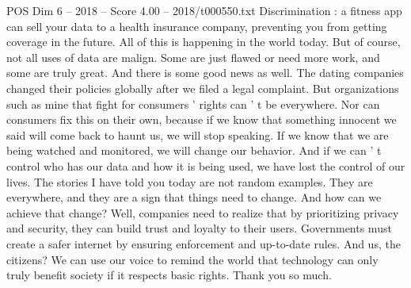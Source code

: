 \begin{textsample}{POS Dim 6 – 2018 – Score 4.00 – 2018/t000550.txt}
Discrimination : a fitness app can sell your data to a health insurance company, preventing you from getting coverage in the future.
All of this is happening in the world today.
But of course, not all uses of data are malign.
Some are just flawed or need more work, and some are truly great.
And there is some good news as well.
The dating companies changed their policies globally after we filed a legal complaint.
But organizations such as mine that fight for consumers ' rights can ' t be everywhere.
Nor can consumers fix this on their own, because if we know that something innocent we said will come back to haunt us, we will stop speaking.
If we know that we are being watched and monitored, we will change our behavior.
And if we can ' t control who has our data and how it is being used, we have lost the control of our lives.
The stories I have told you today are not random examples.
They are everywhere, and they are a sign that things need to change.
And how can we achieve that change?
Well, companies need to realize that by prioritizing privacy and security, they can build trust and loyalty to their users.
Governments must create a safer internet by ensuring enforcement and up-to-date rules.
And us, the citizens?
We can use our voice to remind the world that technology can only truly benefit society if it respects basic rights.
Thank you so much.

\end{textsample}
